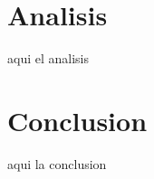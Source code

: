 \documentclass[preprint,12pt]{elsarticle}
\begin{document}
\pagebreak
\section{Analisis}
	

aqui el analisis

\newpage

	
	
\section{Conclusion}
aqui la conclusion

	
	

	
	
	\newpage
	
	
	
	
	
	
	
	
	
	
	
	
	
	
\end{document}
